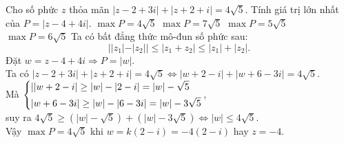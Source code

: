 \begin{ex}%
	Cho số phức $z$ thỏa mãn $|z-2+3i|+|z+2+i|=4\sqrt{5}$. Tính giá trị lớn nhất của $P=|z-4+4i|$.
	\choice
	{\True $\max P=4\sqrt{5}$}
	{$\max P=7\sqrt{5}$}
	{$\max P=5\sqrt{5}$}
	{$\max P=6\sqrt{5}$}
	\loigiai
	{
		Ta có bất đẳng thức mô-đun số phức sau:\vspace{-2ex}
		$$||z_1|-|z_2||\le|z_1+z_2|\le|z_1|+|z_2|.$$
		Đặt $w=z-4+4i\Rightarrow P=|w|$.\\
		Ta có $|z-2+3i|+|z+2+i|=4\sqrt{5} \Leftrightarrow |w+2-i|+|w+6-3i|=4\sqrt{5}$.\\
		Mà $\left\{\begin{aligned}&||w+2-i|\ge|w|-|2-i|=|w|-\sqrt{5}\\&|w+6-3i|\ge|w|-|6-3i|=|w|-3\sqrt{5}\end{aligned}\right.$,\\ suy ra  $4\sqrt{5}\ge\left(|w|-\sqrt{5}\right)+\left(|w|-3\sqrt{5}\right) \Leftrightarrow |w|\le4\sqrt{5}$.\\
		Vậy $\max P=4\sqrt{5}$ khi $w=k(2-i)=-4(2-i)$ hay $z=-4$.
	}
\end{ex}

